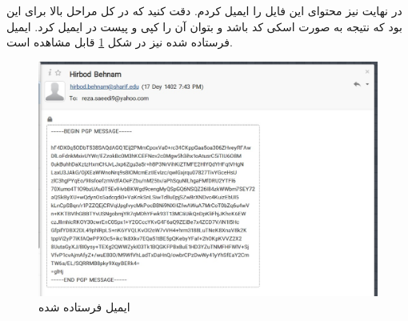 \documentclass[]{article}
\begin{document}
در نهایت نیز محتوای این فایل را ایمیل کردم. دقت کنید که در کل مراحل بالا
برای این بود که نتیجه به صورت اسکی کد باشد و بتوان آن را کپی و پیست در ایمیل کرد.
ایمیل فرستاده شده نیز در شکل
\ref{fig:gpg:email}
قابل مشاهده است.
\begin{figure}[H]
    \centering
    \includegraphics[scale=0.35]{pics/gpg-email.jpg}
    \caption{ایمیل فرستاده شده}
    \label{fig:gpg:email}
\end{figure}
\section{}
\end{document}
